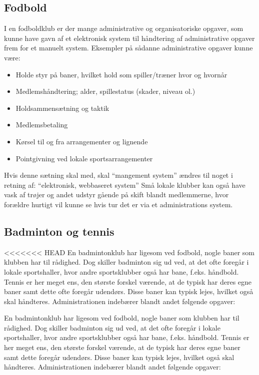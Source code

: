 \subsection{Fodbold} \label{Fodbold}

I en fodboldklub er der mange administrative og organisatoriske opgaver, som kunne have gavn af et elektronisk system
til håndtering af administrative opgaver frem for et manuelt system. Eksempler på sådanne
administrative opgaver kunne være:

\begin{itemize}
\item Holde styr på baner, hvilket hold som spiller/træner hvor og hvornår
\item Medlemshåndtering; alder, spillestatus (skader, niveau ol.)
\item Holdsammensætning og taktik
\item Medlemsbetaling
\item Kørsel til og fra arrangementer og lignende
\item Pointgivning ved lokale sportsarrangementer
\end{itemize}

\begin{anfxnote}{Hvis denne sætning skal med, skal ``mangement system'' ændres til noget i retning af: ``elektronisk, webbaseret system''}
Små lokale klubber kan også have vask af trøjer og andet udstyr gående på skift blandt medlemmerne, hvor forældre hurtigt vil kunne se hvis tur det er via et administrations system. 
\end{anfxnote}


\subsection{Badminton og tennis}
<<<<<<< HEAD
En badmintonklub har ligesom ved fodbold, nogle baner som klubben har til rådighed. Dog skiller badminton sig ud ved, at det ofte foregår i lokale sportshaller, hvor andre sportsklubber også har bane, f.eks. håndbold. Tennis er her meget ens, den største forskel værende, at de typisk har deres egne baner samt dette ofte foregår udendørs. Disse baner kan typisk lejes, hvilket også skal håndteres. Administrationen indebærer blandt andet følgende opgaver:

En badmintonklub har ligesom ved fodbold, nogle baner som klubben har til rådighed. Dog skiller badminton sig ud ved, at det ofte foregår i lokale sportshaller, hvor andre sportsklubber også har bane, f.eks. håndbold. Tennis er her meget ens, den største forskel værende, at de typisk har deres egne baner samt dette foregår udendørs. Disse baner kan typisk lejes, hvilket også skal håndteres. Administrationen indebærer blandt andet følgende opgaver:

